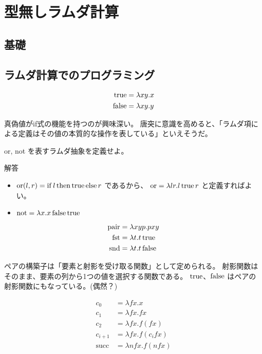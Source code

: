 \chapter{型無しラムダ計算}

\section{基礎}

\section{ラムダ計算でのプログラミング}

\begin{jdefinition}
  \begin{align*}
    \operatorname{true} & = \lambda x y. x
    \\ \operatorname{false} & = \lambda x y. y
  \end{align*}
\end{jdefinition}

真偽値がif式の機能を持つのが興味深い。
唐突に意識を高めると、「ラムダ項による定義はその値の本質的な操作を表している」といえそうだ。

\begin{jexercise*}[5.2.1]
  or, not を表すラムダ抽象を定義せよ。
\end{jexercise*}
\begin{itembox}[l]{解答}
  \begin{itemize}
    \item
      $\operatorname{or}(l, r) = \operatorname{if} l \operatorname{then} \operatorname{true} \operatorname{else} r$ であるから、
      $\operatorname{or} = \lambda l r. l \operatorname{true} r$
      と定義すればよい。
    \item
      $\operatorname{not} = \lambda x. x \operatorname{false} \operatorname{true}$
  \end{itemize}
\end{itembox}

\begin{align*}
  \operatorname{pair} & = \lambda x y p. p x y
  \\ \operatorname{fst} & = \lambda t. t \operatorname{true}
  \\ \operatorname{snd} & = \lambda t. t \operatorname{false}
\end{align*}

ペアの構築子は「要素と射影を受け取る関数」として定められる。
射影関数はそのまま、要素の列から1つの値を選択する関数である。
$\operatorname{true}$、$\operatorname{false}$ はペアの射影関数にもなっている。(偶然？)

\begin{align*}
  c_0 & = \lambda f x. x
  \\ c_1 & = \lambda f x. f x
  \\ c_2 & = \lambda f x. f (f x)
  \\ c_{i+1} & = \lambda f x. f (c_i f x)
  \\ \operatorname{succ} & = \lambda n f x. f (n f x)
\end{align*}

